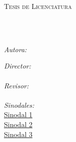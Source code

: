 \documentclass[
12pt, %
spanish, %
singlespacing, %
headsepline, %
]{MastersDoctoralThesis} %
\author{Adriana F. Chávez De la Peña}%
\begin{document}
\frontmatter %

\pagestyle{plain} %


\begin{titlepage}
\begin{center}

\vspace*{.06\textheight}
{\scshape\LARGE \univname\par}\vspace{1.3cm} %
\textsc{\Large Tesis de Licenciatura}\\[0.5cm] %

\HRule \\[0.4cm] %
{\huge \bfseries \ttitle\par}\vspace{0.4cm} %
\HRule \\[1.0cm] %

\begin{minipage}[t]{0.4\textwidth}
\begin{center} \large
\emph{Autora:}\\
\href{adrifelcha@gmail.com}{\authorname} %
\end{center}
 
\begin{center} \large
\emph{Director:}\\
\href{abouzasr@gmail.com}{\supname}\\ %
\emph{Revisor:} \\
\href{germanpalafox@gmail.com}{\examname}\\ %
\emph{Sinodales:} \\
\href{germanpalafox@gmail.com}{Sinodal 1}\\ %
\href{germanpalafox@gmail.com}{Sinodal 2}\\ %
\href{germanpalafox@gmail.com}{Sinodal 3}\\ %
\end{center}
\end{minipage}\\[1.3cm]


\end{center}
\end{titlepage}
\end{document}
